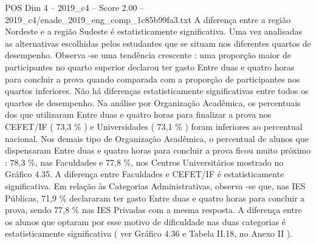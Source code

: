 \begin{textsample}{POS Dim 4 – 2019\_c4 – Score 2.00 – 2019\_c4/enade\_2019\_eng\_comp\_1c85b99fa3.txt}
A diferença entre a região Nordeste e a região Sudeste é estatisticamente significativa.
Uma vez analisadas as alternativas escolhidas pelos estudantes que se situam nos diferentes quartos de desempenho.
Observa -se uma tendência crescente : uma proporção maior de participantes no quarto superior declarou ter gasto Entre duas e quatro horas para concluir a prova quando comparada com a proporção de participantes nos quartos inferiores.
Não há diferenças estatisticamente significativas entre todos os quartos de desempenho.
Na análise por Organização Acadêmica, os percentuais dos que utilizaram Entre duas e quatro horas para finalizar a prova nos CEFET/IF ( 73,3 \% ) e Universidades ( 73,1 \% ) foram inferiores ao percentual nacional.
Nos demais tipo de Organização Acadêmica, o percentual de alunos que dispensaram Entre duas e quatro horas para concluir a prova ficou muito próximo : 78,3 \%, nas Faculdades e 77,8 \%, nos Centros Universitários mostrado no Gráfico 4.35.
A diferença entre Faculdades e CEFET/IF é estatisticamente significativa.
Em relação às Categorias Administrativas, observa -se que, nas IES Públicas, 71,9 \% declararam ter gasto Entre duas e quatro horas para concluir a prova, sendo 77,8 \% nas IES Privadas com a mesma resposta.
A diferença entre os alunos que optaram por esse motivo de dificuldade nas duas categorias é estatisticamente significativa ( ver Gráfico 4.36 e Tabela II.18, no Anexo II ).

\end{textsample}
